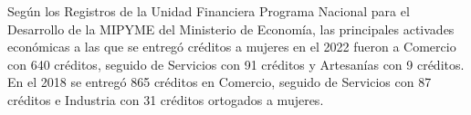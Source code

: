 Según los Registros de la Unidad Financiera Programa Nacional para el Desarrollo de la MIPYME del Ministerio de Economía, las principales activades económicas a las que se entregó créditos a mujeres en el 2022 fueron a Comercio con 640 créditos, seguido de Servicios con 91 créditos y Artesanías con 9 créditos. En el 2018 se entregó 865 créditos en Comercio, seguido de Servicios con 87 créditos e Industria con 31 créditos ortogados a mujeres. 